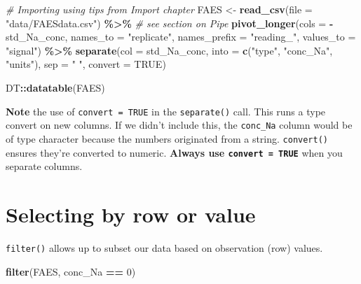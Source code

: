 \documentclass[
]{book}
\newenvironment{Shaded}{\begin{snugshade}}{\end{snugshade}}
\newcommand{\AttributeTok}[1]{\textcolor[rgb]{0.13,0.29,0.53}{#1}}
\newcommand{\CommentTok}[1]{\textcolor[rgb]{0.56,0.35,0.01}{\textit{#1}}}
\newcommand{\ConstantTok}[1]{\textcolor[rgb]{0.56,0.35,0.01}{#1}}
\newcommand{\DecValTok}[1]{\textcolor[rgb]{0.00,0.00,0.81}{#1}}
\newcommand{\FunctionTok}[1]{\textcolor[rgb]{0.13,0.29,0.53}{\textbf{#1}}}
\newcommand{\NormalTok}[1]{#1}
\newcommand{\OtherTok}[1]{\textcolor[rgb]{0.56,0.35,0.01}{#1}}
\newcommand{\SpecialCharTok}[1]{\textcolor[rgb]{0.81,0.36,0.00}{\textbf{#1}}}
\newcommand{\StringTok}[1]{\textcolor[rgb]{0.31,0.60,0.02}{#1}}
\begin{document}
\begin{Shaded}
\begin{Highlighting}[]
\CommentTok{\# Importing using tips from Import chapter}
\NormalTok{FAES }\OtherTok{\textless{}{-}} \FunctionTok{read\_csv}\NormalTok{(}\AttributeTok{file =} \StringTok{"data/FAESdata.csv"}\NormalTok{) }\SpecialCharTok{\%\textgreater{}\%} \CommentTok{\# see section on Pipe}
  \FunctionTok{pivot\_longer}\NormalTok{(}\AttributeTok{cols =} \SpecialCharTok{{-}}\NormalTok{std\_Na\_conc,}
               \AttributeTok{names\_to =} \StringTok{"replicate"}\NormalTok{, }
               \AttributeTok{names\_prefix =} \StringTok{"reading\_"}\NormalTok{,}
               \AttributeTok{values\_to =} \StringTok{"signal"}\NormalTok{) }\SpecialCharTok{\%\textgreater{}\%}
  \FunctionTok{separate}\NormalTok{(}\AttributeTok{col =}\NormalTok{ std\_Na\_conc,}
           \AttributeTok{into =} \FunctionTok{c}\NormalTok{(}\StringTok{"type"}\NormalTok{, }\StringTok{"conc\_Na"}\NormalTok{, }\StringTok{"units"}\NormalTok{),}
           \AttributeTok{sep =} \StringTok{" "}\NormalTok{,}
           \AttributeTok{convert =} \ConstantTok{TRUE}\NormalTok{)}

\NormalTok{DT}\SpecialCharTok{::}\FunctionTok{datatable}\NormalTok{(FAES)}
\end{Highlighting}
\end{Shaded}

\textbf{Note} the use of \texttt{convert\ =\ TRUE} in the \texttt{separate()} call. This runs a type convert on new columns. If we didn't include this, the \texttt{conc\_Na} column would be of type character because the numbers originated from a string. \texttt{convert()} ensures they're converted to numeric. \textbf{Always use \texttt{convert\ =\ TRUE}} when you separate columns.

\hypertarget{selecting-by-row-or-value}{%
\section{Selecting by row or value}\label{selecting-by-row-or-value}}

\texttt{filter()} allows up to subset our data based on observation (row) values.

\begin{Shaded}
\begin{Highlighting}[]
\FunctionTok{filter}\NormalTok{(FAES, conc\_Na }\SpecialCharTok{==} \DecValTok{0}\NormalTok{)}
\end{Highlighting}
\end{Shaded}
\end{document}

